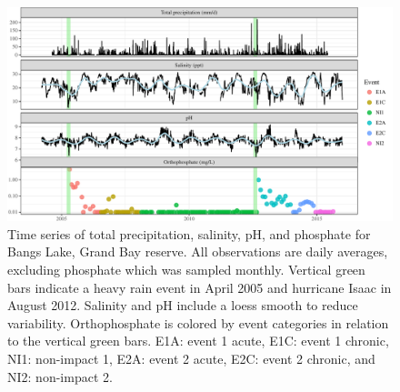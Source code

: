\documentclass[letterpaper,12pt]{article}\usepackage[]{graphicx}\usepackage[]{color}
\begin{document}
\setcounter{figure}{1}

\begin{landscape}
\centering\vspace*{\fill}
\begin{figure}[!ht]

{\centering \includegraphics[width=1.3\textwidth]{figs/Fig2} 

}

\caption[Time series of total precipitation, salinity, pH, and phosphate for Bangs Lake, Grand Bay reserve]{Time series of total precipitation, salinity, pH, and phosphate for Bangs Lake, Grand Bay reserve.  All observations are daily averages, excluding phosphate which was sampled monthly.  Vertical green bars indicate a heavy rain event in April 2005 and hurricane Isaac in August 2012.  Salinity and pH include a loess smooth to reduce variability. Orthophosphate is colored by event categories in relation to the vertical green bars.  E1A: event 1 acute, E1C: event 1 chronic, NI1: non-impact 1, E2A: event 2 acute, E2C: event 2 chronic, and NI2: non-impact 2.}\label{fig:Fig2}
\end{figure}


\end{landscape}
\clearpage
\end{document}
